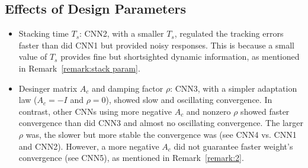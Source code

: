 \documentclass[letterpaper, 10 pt, conference]{ieeeconf}  %
\begin{document}
\subsection{Effects of Design Parameters}
\begin{itemize}
\item Stacking time $T_s$: CNN2, with a smaller $T_s$, regulated the tracking errors faster than did CNN1 but provided noisy responses. This is because a small value of $T_s$ provides fine but shortsighted dynamic information, as mentioned in Remark~\ref{remark:stack param}.
\item Desinger matrix $A_c$ and damping factor $\rho$: CNN3, with a simpler adaptation law ($A_c = -I$ and $\rho = 0$), showed slow and oscillating convergence. In contrast, other CNNs using more negative $A_c$ and nonzero $\rho$ showed faster convergence than did CNN3 and almost no oscillating convergence. The larger $\rho$ was, the slower but more stable the convergence was (see CNN4 vs. CNN1 and CNN2). However, a more negative $A_c$ did not guarantee faster weight's convergence (see CNN5), as mentioned in Remark~\ref{remark:2}.
\end{itemize}

\end{document}
